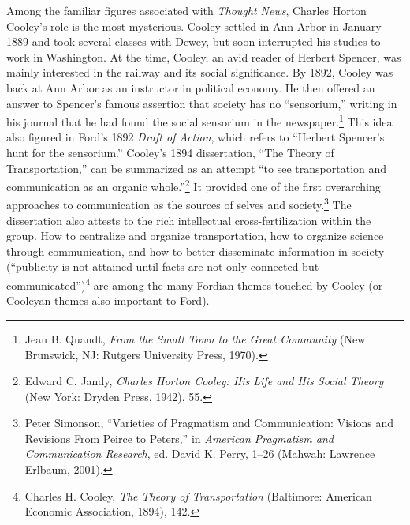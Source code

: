 \documentclass[openany,nobib]{tufte-book}
\begin{document}
Among the familiar figures associated with \emph{Thought News}, Charles
Horton Cooley's role is the most mysterious. Cooley settled in Ann Arbor
in January 1889 and took several classes with Dewey, but soon
interrupted his studies to work in Washington. At the time, Cooley, an
avid reader of Herbert Spencer, was mainly interested in the railway and
its social significance. By 1892, Cooley was back at Ann Arbor as an
instructor in political economy. He then offered an answer to Spencer's
famous assertion that society has no ``sensorium,'' writing in his
journal that he had found the social sensorium in the
newspaper.\footnote{Jean B. Quandt, \emph{From the Small Town to the
  Great Community} (New Brunswick, NJ: Rutgers University Press, 1970).}
This idea also figured in Ford's 1892 \emph{Draft of Action}, which
refers to ``Herbert Spencer's hunt for the sensorium.'' Cooley's 1894
dissertation, ``The Theory of Transportation,'' can be summarized as an
attempt ``to see transportation and communication as an organic
whole.''\footnote{Edward C. Jandy, \emph{Charles Horton Cooley: His Life
  and His Social Theory} (New York: Dryden Press, 1942), 55.} It
provided one of the first overarching approaches to communication as the
sources of selves and society.\footnote{Peter Simonson, ``Varieties of
  Pragmatism and Communication: Visions and Revisions From Peirce to
  Peters,'' in \emph{American Pragmatism and Communication Research},
  ed. David K. Perry, 1--26 (Mahwah: Lawrence Erlbaum, 2001).} The
dissertation also attests to the rich intellectual cross-fertilization
within the group. How to centralize and organize transportation, how to
organize science through communication, and how to better disseminate
information in society (``publicity is not attained until facts are not
only connected but communicated'')\footnote{Charles H. Cooley, \emph{The
  Theory of Transportation} (Baltimore: American Economic Association,
  1894), 142.} are among the many Fordian themes touched by Cooley (or
Cooleyan themes also important to Ford).
\end{document}

